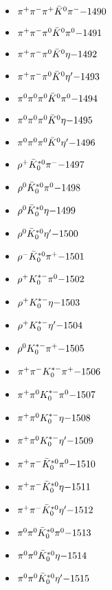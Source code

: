 \begin{multicols}{3}
\begin{itemize}
 \item $ \pi^{+} \pi^{-} \pi^{+} \bar{K}^{0} \pi^{-} \hfill{-1490}$
 \item $ \pi^{+} \pi^{-} \pi^{0} \bar{K}^{0} \pi^{0} \hfill{-1491}$
 \item $ \pi^{+} \pi^{-} \pi^{0} \bar{K}^{0} \eta \hfill{-1492}$
 \item $ \pi^{+} \pi^{-} \pi^{0} \bar{K}^{0} {\eta^{\prime}} \hfill{-1493}$
 \item $ \pi^{0} \pi^{0} \pi^{0} \bar{K}^{0} \pi^{0} \hfill{-1494}$
 \item $ \pi^{0} \pi^{0} \pi^{0} \bar{K}^{0} \eta \hfill{-1495}$
 \item $ \pi^{0} \pi^{0} \pi^{0} \bar{K}^{0} {\eta^{\prime}} \hfill{-1496}$
 \item $ \rho^{+} \bar{K}_{0}^{*0} \pi^{-} \hfill{-1497}$
 \item $ \rho^{0} \bar{K}_{0}^{*0} \pi^{0} \hfill{-1498}$
 \item $ \rho^{0} \bar{K}_{0}^{*0} \eta \hfill{-1499}$
 \item $ \rho^{0} \bar{K}_{0}^{*0} {\eta^{\prime}} \hfill{-1500}$
 \item $ \rho^{-} \bar{K}_{0}^{*0} \pi^{+} \hfill{-1501}$
 \item $ \rho^{+} K_{0}^{*-} \pi^{0} \hfill{-1502}$
 \item $ \rho^{+} K_{0}^{*-} \eta \hfill{-1503}$
 \item $ \rho^{+} K_{0}^{*-} {\eta^{\prime}} \hfill{-1504}$
 \item $ \rho^{0} K_{0}^{*-} \pi^{+} \hfill{-1505}$
 \item $ \pi^{+} \pi^{-} K_{0}^{*-} \pi^{+} \hfill{-1506}$
 \item $ \pi^{+} \pi^{0} K_{0}^{*-} \pi^{0} \hfill{-1507}$
 \item $ \pi^{+} \pi^{0} K_{0}^{*-} \eta \hfill{-1508}$
 \item $ \pi^{+} \pi^{0} K_{0}^{*-} {\eta^{\prime}} \hfill{-1509}$
 \item $ \pi^{+} \pi^{-} \bar{K}_{0}^{*0} \pi^{0} \hfill{-1510}$
 \item $ \pi^{+} \pi^{-} \bar{K}_{0}^{*0} \eta \hfill{-1511}$
 \item $ \pi^{+} \pi^{-} \bar{K}_{0}^{*0} {\eta^{\prime}} \hfill{-1512}$
 \item $ \pi^{0} \pi^{0} \bar{K}_{0}^{*0} \pi^{0} \hfill{-1513}$
 \item $ \pi^{0} \pi^{0} \bar{K}_{0}^{*0} \eta \hfill{-1514}$
 \item $ \pi^{0} \pi^{0} \bar{K}_{0}^{*0} {\eta^{\prime}} \hfill{-1515}$

\end{itemize}
\end{multicols}
